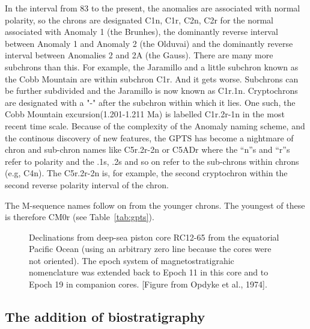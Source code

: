 In the interval from 83 to the present, the anomalies are associated with normal polarity, so the chrons are designated C1n, C1r, C2n, C2r for the normal associated with Anomaly 1 (the Brunhes), the dominantly reverse interval between Anomaly 1 and Anomaly 2 (the Olduvai) and the dominantly reverse interval between Anomalies 2 and 2A (the Gauss).    There are many more subchrons than this.  For example, the Jaramillo and  a little subchron known as the Cobb Mountain are within subchron C1r.  And it gets worse.   Subchrons can be further subdivided and the Jaramillo is now known as C1r.1n.     Cryptochrons are designated with a "-" after the subchron within which it lies.  One such, the  Cobb Mountain  excursion(1.201-1.211 Ma) is labelled C1r.2r-1n in the most recent time scale.       Because of the complexity of the Anomaly naming scheme, and the continous discovery of new features,  the  GPTS has become  a nightmare of chron and sub-chron names like C5r.2r-2n or C5ADr where the ``n''s and ``r''s refer to polarity and the .1s, .2s and so on refer to the sub-chrons within chrons (e.g, C4n). The C5r.2r-2n is, for example,  the second cryptochron within the second reverse polarity interval of the chron.       \nocite{gee07,channell95,cande95,lowrie04}

The M-sequence names   follow on from the younger chrons.  The youngest of these is therefore CM0r (see Table~\ref{tab:gpts}).  

\begin{figure}[htb]
\epsfxsize 15cm
\centering {}
\caption{Declinations from deep-sea piston core RC12-65 from the equatorial Pacific Ocean (using an arbitrary zero line because the cores were not oriented).  The epoch system of magnetostratigrahic nomenclature was extended back to Epoch 11 in this core and to Epoch 19 in companion cores.   [Figure from Opdyke et al., 1974].}
\label{fig:opdyke74}
\end{figure}

\subsection{The addition of biostratigraphy}
  
